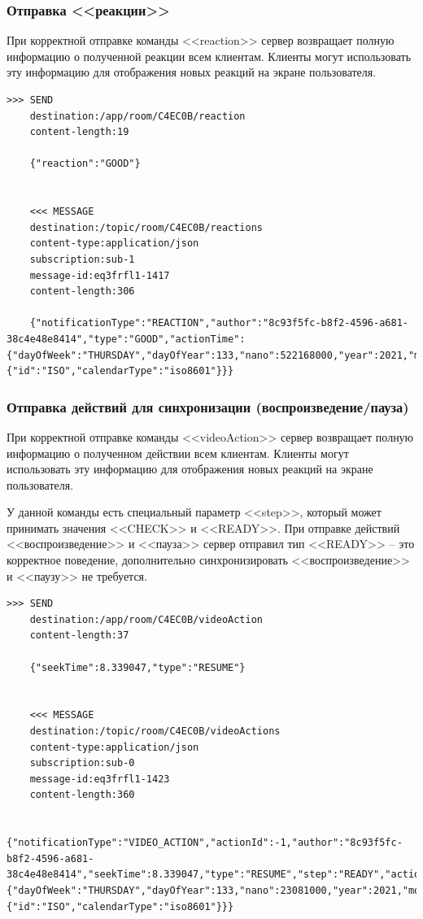 \documentclass{../includes/TechDocMultiAuthors}
\begin{document}
    \subsubsection{Отправка <<реакции>>}

    При корректной отправке команды <<reaction>> сервер возвращает полную информацию о полученной реакции всем клиентам.
    Клиенты могут использовать эту информацию для отображения новых реакций на экране пользователя.

    \begin{lstlisting}[language=text,caption={Запрос и ответ при отправке <<реакции>>}]
    >>> SEND
    destination:/app/room/C4EC0B/reaction
    content-length:19

    {"reaction":"GOOD"}


    <<< MESSAGE
    destination:/topic/room/C4EC0B/reactions
    content-type:application/json
    subscription:sub-1
    message-id:eq3frfl1-1417
    content-length:306

    {"notificationType":"REACTION","author":"8c93f5fc-b8f2-4596-a681-38c4e48e8414","type":"GOOD","actionTime":{"dayOfWeek":"THURSDAY","dayOfYear":133,"nano":522168000,"year":2021,"monthValue":5,"dayOfMonth":13,"hour":23,"minute":31,"second":50,"month":"MAY","chronology":{"id":"ISO","calendarType":"iso8601"}}}
    \end{lstlisting}

    \subsubsection{Отправка действий для синхронизации (воспроизведение/пауза)}

    При корректной отправке команды <<videoAction>> сервер возвращает полную информацию о полученном действии всем клиентам.
    Клиенты могут использовать эту информацию для отображения новых реакций на экране пользователя.

    У данной команды есть специальный параметр <<step>>, который может принимать значения <<CHECK>> и <<READY>>.
    При отправке действий <<воспроизведение>> и <<пауза>> сервер отправил тип <<READY>> -- это корректное поведение, дополнительно синхронизировать <<воспроизведение>> и <<паузу>> не требуется.

    \begin{lstlisting}[language=text,caption={Запрос и ответ при отправке действия для синхронизации}]
    >>> SEND
    destination:/app/room/C4EC0B/videoAction
    content-length:37

    {"seekTime":8.339047,"type":"RESUME"}


    <<< MESSAGE
    destination:/topic/room/C4EC0B/videoActions
    content-type:application/json
    subscription:sub-0
    message-id:eq3frfl1-1423
    content-length:360

    {"notificationType":"VIDEO_ACTION","actionId":-1,"author":"8c93f5fc-b8f2-4596-a681-38c4e48e8414","seekTime":8.339047,"type":"RESUME","step":"READY","actionTime":{"dayOfWeek":"THURSDAY","dayOfYear":133,"nano":23081000,"year":2021,"monthValue":5,"dayOfMonth":13,"hour":23,"minute":37,"second":34,"month":"MAY","chronology":{"id":"ISO","calendarType":"iso8601"}}}
    \end{lstlisting}
\end{document}
